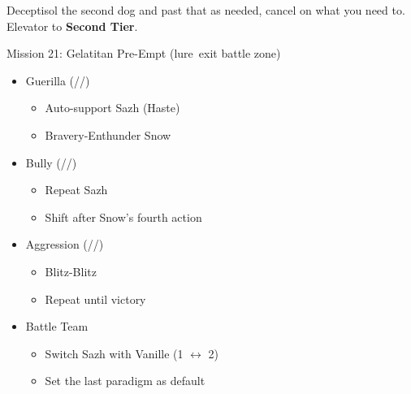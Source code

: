 \renewcommand{\first}{[1] Guerilla (\syn/\sab/\rav)}
\renewcommand{\second}{[2] Tireless Charge (\com/\med/\com)}
\renewcommand{\third}{[3] Hero's Charge (\syn/\med/\com)}
\renewcommand{\fourth}{[4] Devastation (\com/\sab/\com)}
\renewcommand{\fifth}{[5] Bully (\syn/\sab/\com)}
\renewcommand{\sixth}{[6] Aggression (\com/\rav/\com)}
\begin{multicols}{2}

Deceptisol the second dog and past that as needed, cancel on what you need to.
Elevator to \textbf{Second Tier}.
\begin{battle}{Mission 21: Gelatitan Pre-Empt (lure\, exit battle zone)}
\begin{itemize}
    \item \first
    \begin{itemize}
        \item Auto-support Sazh (Haste)
        \item Bravery-Enthunder Snow
    \end{itemize}
    \item \fifth
    \begin{itemize}
        \item Repeat Sazh
        \item Shift after Snow's fourth action
    \end{itemize}
    \item \sixth
    \begin{itemize}
        \item Blitz-Blitz
        \item Repeat until victory
    \end{itemize}
\end{itemize}
\end{battle}
\begin{menu}
\begin{itemize}
    \paradigm
    \begin{itemize}
        \item Battle Team
        \begin{itemize}
            \item Switch Sazh with Vanille (1 $\leftrightarrow$ 2)
            \item Set the last paradigm as default
        \end{itemize}
    \end{itemize}
\end{itemize}
\end{menu}


\end{multicols}
